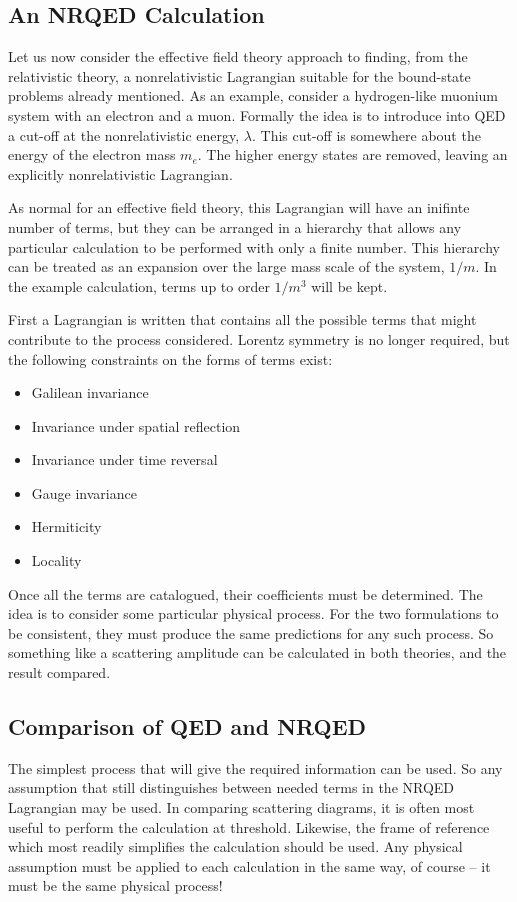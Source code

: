 \subsection{An NRQED Calculation}

Let us now consider the effective field theory approach to finding, from the relativistic theory, a nonrelativistic Lagrangian suitable for the bound-state problems already mentioned.  As an example, consider a hydrogen-like muonium system with an electron and a muon.  Formally the idea is to introduce into QED a cut-off at the nonrelativistic energy, $\lambda$.  This cut-off is somewhere about the energy of the electron mass $m_e$.    The higher energy states are removed, leaving an explicitly nonrelativistic Lagrangian.

As normal for an effective field theory, this Lagrangian will have an inifinte number of terms, but they can be arranged in a hierarchy that allows any particular calculation to be performed with only a finite number.  This hierarchy can be treated as an expansion over the large mass scale of the system, $1/m$.  In the example calculation, terms up to order $1/m^3$ will be kept.

First a Lagrangian is written that contains all the possible terms that might contribute to the process considered.  Lorentz symmetry is no longer required, but the following constraints on the forms of terms exist:
\begin{itemize}
  \item Galilean invariance
  \item Invariance under spatial reflection
  \item Invariance under time reversal
  \item Gauge invariance
  \item Hermiticity
  \item Locality
\end{itemize}

Once all the terms are catalogued, their coefficients must be determined.  The idea is to consider some particular physical process.  For the two formulations to be consistent, they must produce the same predictions for any such process.  So something like a scattering amplitude can be calculated in both theories, and the result compared.

\subsection{Comparison of QED and NRQED}
The simplest process that will give the required information can be used.  So any assumption that still distinguishes between needed terms in the NRQED Lagrangian may be used.  In comparing scattering diagrams, it is often most useful to perform the calculation at threshold.  Likewise, the  frame of reference which most readily simplifies the calculation should be used.  Any physical assumption must be applied to each calculation in the same way, of course -- it must be the same physical process!

